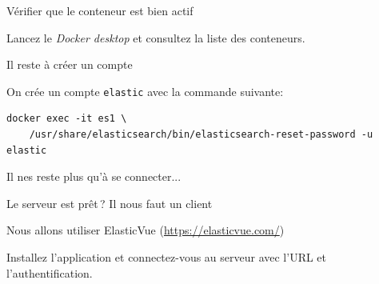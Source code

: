 \begin{frame}[fragile]{Vérifier que le conteneur est bien actif}

Lancez le \textit{Docker desktop} et consultez la liste des conteneurs.

\vfill

\end{frame}



\begin{frame}[fragile]{Il reste à créer un compte}

On crée un compte \texttt{elastic} avec la commande suivante:


\begin{verbatim}
docker exec -it es1 \
    /usr/share/elasticsearch/bin/elasticsearch-reset-password -u elastic
\end{verbatim}

\vfill

Il nes reste plus qu'à se connecter...
\end{frame}

\begin{frame}{Le serveur est prêt\,? Il nous faut un client}

Nous allons utiliser ElasticVue (\url{https://elasticvue.com/})

\vfill

Installez l'application et connectez-vous au serveur avec l'URL et l'authentification.

\vfill

\centerline{}

\end{frame}

